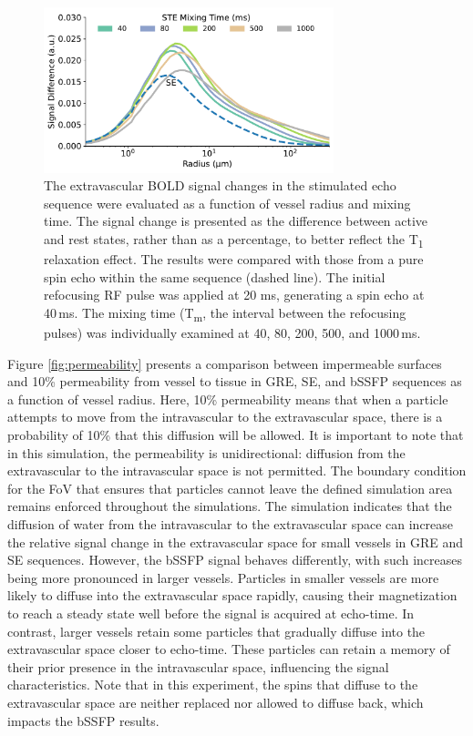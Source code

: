 \begin{figure}[!htbp]
    \centering
    \includegraphics[width=0.75\textwidth]{fig6_ste.pdf}
    \caption{The extravascular BOLD signal changes in the stimulated echo sequence were evaluated as a function of vessel radius and mixing time. The signal change is presented as the difference between active and rest states, rather than as a percentage, to better reflect the T\textsubscript{1} relaxation effect. The results were compared with those from a pure spin echo within the same sequence (dashed line). The initial refocusing RF pulse was applied at 20 ms, generating a spin echo at 40\,ms. The mixing time (T\textsubscript{m}, the interval between the refocusing pulses) was individually examined at 40, 80, 200, 500, and 1000\,ms. }
    \label{fig:ste}
\end{figure}

Figure \ref{fig:permeability} presents a comparison between impermeable surfaces and 10\% permeability from vessel to tissue in GRE, SE, and bSSFP sequences as a function of vessel radius. Here, 10\% permeability means that when a particle attempts to move from the intravascular to the extravascular space, there is a probability of 10\% that this diffusion will be allowed. It is important to note that in this simulation, the permeability is unidirectional: diffusion from the extravascular to the intravascular space is not permitted. The boundary condition for the FoV that ensures that particles cannot leave the defined simulation area remains enforced throughout the simulations. The simulation indicates that the diffusion of water from the intravascular to the extravascular space can increase the relative signal change in the extravascular space for small vessels in GRE and SE sequences. However, the bSSFP signal behaves differently, with such increases being more pronounced in larger vessels.  Particles in smaller vessels are more likely to diffuse into the extravascular space rapidly, causing their magnetization to reach a steady state well before the signal is acquired at echo-time. In contrast, larger vessels retain some particles that gradually diffuse into the extravascular space closer to echo-time. These particles can retain a memory of their prior presence in the intravascular space, influencing the signal characteristics. Note that in this experiment, the spins that diffuse to the extravascular space are neither replaced nor allowed to diffuse back, which impacts the bSSFP results.


